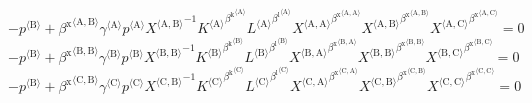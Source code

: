 \begin{equation}
-{p}^{\langle \mathrm{B}\rangle} + {{\beta^{\mathrm{x}}}^{\langle \mathrm{\mathrm{A}},\mathrm{\mathrm{B}}\rangle}} {{\gamma}^{\langle \mathrm{\mathrm{A}}\rangle}} {{p}^{\langle \mathrm{A}\rangle}} {{X}^{\langle \mathrm{A},\mathrm{B}\rangle}}^{-1} {{{K}^{\langle \mathrm{A}\rangle}}^{{\beta^{\mathrm{k}}}^{\langle \mathrm{\mathrm{A}}\rangle}}} {{{L}^{\langle \mathrm{A}\rangle}}^{{\beta^{\mathrm{l}}}^{\langle \mathrm{\mathrm{A}}\rangle}}} {{{X}^{\langle \mathrm{A},\mathrm{A}\rangle}}^{{\beta^{\mathrm{x}}}^{\langle \mathrm{\mathrm{A}},\mathrm{\mathrm{A}}\rangle}}} {{{X}^{\langle \mathrm{A},\mathrm{B}\rangle}}^{{\beta^{\mathrm{x}}}^{\langle \mathrm{\mathrm{A}},\mathrm{\mathrm{B}}\rangle}}} {{{X}^{\langle \mathrm{A},\mathrm{C}\rangle}}^{{\beta^{\mathrm{x}}}^{\langle \mathrm{\mathrm{A}},\mathrm{\mathrm{C}}\rangle}}} = 0
\end{equation}
\begin{equation}
-{p}^{\langle \mathrm{B}\rangle} + {{\beta^{\mathrm{x}}}^{\langle \mathrm{\mathrm{B}},\mathrm{\mathrm{B}}\rangle}} {{\gamma}^{\langle \mathrm{\mathrm{B}}\rangle}} {{p}^{\langle \mathrm{B}\rangle}} {{X}^{\langle \mathrm{B},\mathrm{B}\rangle}}^{-1} {{{K}^{\langle \mathrm{B}\rangle}}^{{\beta^{\mathrm{k}}}^{\langle \mathrm{\mathrm{B}}\rangle}}} {{{L}^{\langle \mathrm{B}\rangle}}^{{\beta^{\mathrm{l}}}^{\langle \mathrm{\mathrm{B}}\rangle}}} {{{X}^{\langle \mathrm{B},\mathrm{A}\rangle}}^{{\beta^{\mathrm{x}}}^{\langle \mathrm{\mathrm{B}},\mathrm{\mathrm{A}}\rangle}}} {{{X}^{\langle \mathrm{B},\mathrm{B}\rangle}}^{{\beta^{\mathrm{x}}}^{\langle \mathrm{\mathrm{B}},\mathrm{\mathrm{B}}\rangle}}} {{{X}^{\langle \mathrm{B},\mathrm{C}\rangle}}^{{\beta^{\mathrm{x}}}^{\langle \mathrm{\mathrm{B}},\mathrm{\mathrm{C}}\rangle}}} = 0
\end{equation}
\begin{equation}
-{p}^{\langle \mathrm{B}\rangle} + {{\beta^{\mathrm{x}}}^{\langle \mathrm{\mathrm{C}},\mathrm{\mathrm{B}}\rangle}} {{\gamma}^{\langle \mathrm{\mathrm{C}}\rangle}} {{p}^{\langle \mathrm{C}\rangle}} {{X}^{\langle \mathrm{C},\mathrm{B}\rangle}}^{-1} {{{K}^{\langle \mathrm{C}\rangle}}^{{\beta^{\mathrm{k}}}^{\langle \mathrm{\mathrm{C}}\rangle}}} {{{L}^{\langle \mathrm{C}\rangle}}^{{\beta^{\mathrm{l}}}^{\langle \mathrm{\mathrm{C}}\rangle}}} {{{X}^{\langle \mathrm{C},\mathrm{A}\rangle}}^{{\beta^{\mathrm{x}}}^{\langle \mathrm{\mathrm{C}},\mathrm{\mathrm{A}}\rangle}}} {{{X}^{\langle \mathrm{C},\mathrm{B}\rangle}}^{{\beta^{\mathrm{x}}}^{\langle \mathrm{\mathrm{C}},\mathrm{\mathrm{B}}\rangle}}} {{{X}^{\langle \mathrm{C},\mathrm{C}\rangle}}^{{\beta^{\mathrm{x}}}^{\langle \mathrm{\mathrm{C}},\mathrm{\mathrm{C}}\rangle}}} = 0
\end{equation}

